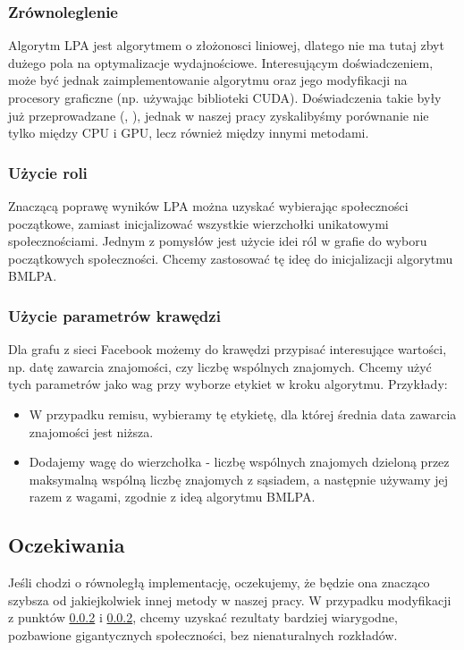 \documentclass{article}
\begin{document}
\subsubsection{Zrównoleglenie}
Algorytm LPA jest algorytmem o złożonosci liniowej, dlatego nie ma tutaj zbyt dużego pola na optymalizacje wydajnościowe. Interesującym doświadczeniem, może być jednak zaimplementowanie algorytmu oraz jego modyfikacji na procesory graficzne (np. używając biblioteki CUDA). Doświadczenia takie były już przeprowadzane (\cite{ms-paper5}, \cite{ms-paper6}), jednak w naszej pracy zyskalibyśmy porównanie nie tylko między CPU i GPU, lecz również między innymi metodami.
\subsubsection{Użycie roli}
\label{subsubsection:lparole}
Znaczącą poprawę wyników LPA można uzyskać wybierając społeczności początkowe, zamiast inicjalizować wszystkie wierzchołki unikatowymi społecznościami. Jednym z pomysłów jest użycie idei ról w grafie do wyboru początkowych społeczności\cite{ms-paper7}. Chcemy zastosować tę ideę do inicjalizacji algorytmu BMLPA.
\subsubsection{Użycie parametrów krawędzi}
\label{subsubsection:lpaedges}
Dla grafu z sieci Facebook możemy do krawędzi przypisać interesujące wartości, np. datę zawarcia znajomości, czy liczbę wspólnych znajomych. Chcemy użyć tych parametrów jako wag przy wyborze etykiet w kroku algorytmu. Przykłady:
\begin{itemize}
\item W przypadku remisu, wybieramy tę etykietę, dla której średnia data zawarcia znajomości jest niższa.
\item Dodajemy wagę do wierzchołka - liczbę wspólnych znajomych dzieloną przez maksymalną wspólną liczbę znajomych z sąsiadem, a następnie używamy jej razem z wagami, zgodnie z ideą algorytmu BMLPA.
\end{itemize}

\subsection{Oczekiwania}
Jeśli chodzi o równoległą implementację, oczekujemy, że będzie ona znacząco szybsza od jakiejkolwiek innej metody w naszej pracy. W przypadku modyfikacji z punktów \ref{subsubsection:lparole} i \ref{subsubsection:lparole}, chcemy uzyskać rezultaty bardziej wiarygodne, pozbawione gigantycznych społeczności, bez nienaturalnych rozkładów.
\end{document}
